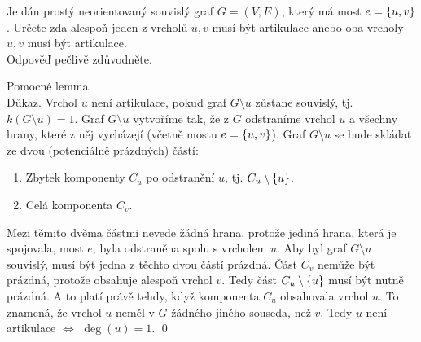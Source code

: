 \documentclass[11pt,a4paper]{article}
\begin{document}
\title{}
\author{Jakub Adamec\\XP01TGR}

\maketitle

\begin{exercise}
Je dán prostý neorientovaný souvislý graf $G = (V,E)$, který má most $e = \left\lbrace u,v \right\rbrace$. Určete zda alespoň jeden z vrcholů
$u,v$ musí být artikulace anebo oba vrcholy $u,v$ musí být artikulace.\\
Odpověď pečlivě zdůvodněte.
\end{exercise}
\begin{solution}
Pomocné lemma. \\
Důkaz. Vrchol $u$ není artikulace, pokud graf $G \setminus u$ zůstane souvislý, tj. $k(G \setminus u) = 1$. Graf 
$G \setminus u$ vytvoříme tak, že z $G$ odstraníme vrchol $u$ a všechny hrany, které z něj vycházejí (včetně mostu 
$e = \left\lbrace u,v \right\rbrace$). Graf $G \setminus u$ se bude skládat ze dvou (potenciálně prázdných) částí:
\begin{enumerate}[(1), noitemsep]
    \item Zbytek komponenty $C_u$ po odstranění $u$, tj. $C_u \setminus \left\lbrace u \right\rbrace$.
    \item Celá komponenta $C_v$.
\end{enumerate}
Mezi těmito dvěma částmi nevede žádná hrana, protože jediná hrana, která je spojovala, most $e$, byla odstraněna spolu s 
vrcholem $u$. Aby byl graf $G \setminus u$ souvislý, musí být jedna z těchto dvou částí prázdná.  Část $C_v$ nemůže být 
prázdná, protože obsahuje alespoň vrchol $v$.  Tedy část $C_u \setminus \left\lbrace u \right\rbrace$ musí být nutně prázdná. A to platí právě 
tehdy, když komponenta $C_u$ obsahovala  vrchol $u$. To znamená, že vrchol $u$ neměl v $G$ žádného jiného 
souseda, než $v$. Tedy $u$ není artikulace $\iff$ $\deg(u)=1$. 
\hspace{\fill}\qed 


\end{solution}
\end{document}
